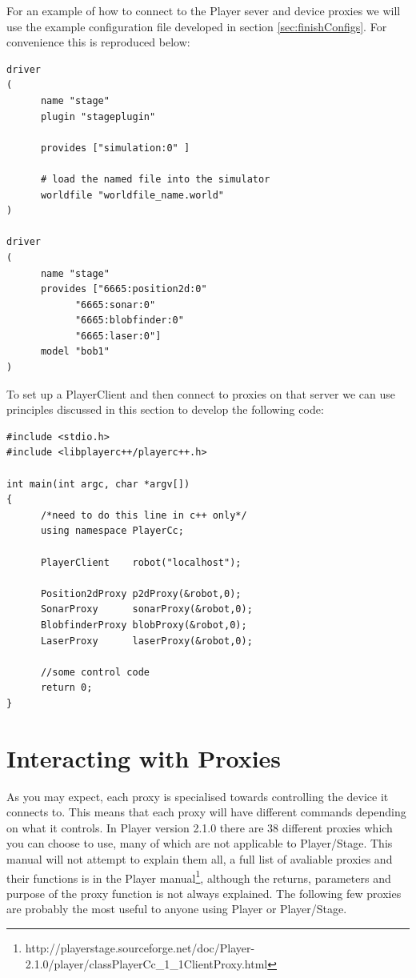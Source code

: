\documentclass[a4paper]{report}
\newcommand{\plst}{Player/Stage\xspace}
\newcommand{\pl}{Player\xspace}
\begin{document}
For an example of how to connect to the \pl sever and device proxies we will use the example configuration file developed in section \ref{sec:finishConfigs}. For convenience this is reproduced below:
\begin{verbatim}
driver
(		
      name "stage"
      plugin "stageplugin"

      provides ["simulation:0" ]

      # load the named file into the simulator
      worldfile "worldfile_name.world"	
)      

driver
(
      name "stage"
      provides ["6665:position2d:0" 
            "6665:sonar:0" 
            "6665:blobfinder:0" 
            "6665:laser:0"]
      model "bob1" 
)
\end{verbatim}
To set up a PlayerClient and then connect to proxies on that server we can use principles discussed in this section to develop the following code:
\begin{verbatim}
#include <stdio.h>
#include <libplayerc++/playerc++.h>

int main(int argc, char *argv[])
{
      /*need to do this line in c++ only*/
      using namespace PlayerCc;
	
      PlayerClient    robot("localhost");

      Position2dProxy p2dProxy(&robot,0);
      SonarProxy      sonarProxy(&robot,0);
      BlobfinderProxy blobProxy(&robot,0);
      LaserProxy      laserProxy(&robot,0);

      //some control code
      return 0;
}
\end{verbatim}

\section{Interacting with Proxies}\label{sec:interactingwithproxies}

As you may expect, each proxy is specialised towards controlling the device it connects to. This means that each proxy will have different commands depending on what it controls. 
In Player version 2.1.0 there are 38 different proxies which you can choose to use, many of which are not applicable to \plst. This manual will not attempt to explain them all, a full list of avaliable proxies and their functions is in the \pl manual\footnote{http://playerstage.sourceforge.net/doc/Player-2.1.0/player/classPlayerCc\_1\_1ClientProxy.html}, although the returns, parameters and purpose of the proxy function is not always explained. 
\newline The following few proxies are probably the most useful to anyone using \pl or \plst.
\end{document}
